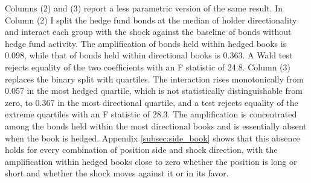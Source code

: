 \documentclass[english, 11pt, oneside]{article}
\begin{document}
Columns (2) and (3) report a less parametric version of the same result. In Column (2) I split the hedge fund bonds at the median of holder directionality and interact each group with the shock against the baseline of bonds without hedge fund activity. The amplification of bonds held within hedged books is 0.098, while that of bonds held within directional books is 0.363. A Wald test rejects equality of the two coefficients with an F statistic of 24.8. Column (3) replaces the binary split with quartiles. The interaction rises monotonically from 0.057 in the most hedged quartile, which is not statistically distinguishable from zero, to 0.367 in the most directional quartile, and a test rejects equality of the extreme quartiles with an F statistic of 28.3. The amplification is concentrated among the bonds held within the most directional books and is essentially absent when the book is hedged. Appendix \ref{subsec:side_book} shows that this absence holds for every combination of position side and shock direction, with the amplification within hedged books close to zero whether the position is long or short and whether the shock moves against it or in its favor.
\end{document}
